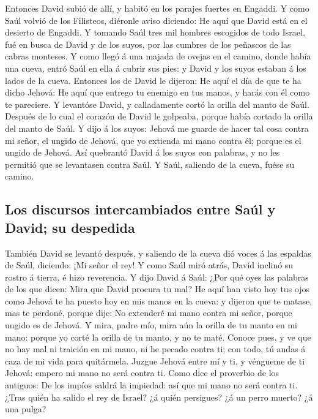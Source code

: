  Entonces David subió de allí, y habitó en los parajes
fuertes en Engaddi.  Y como Saúl volvió de los Filisteos,
diéronle aviso diciendo: He aquí que David está en el desierto de
Engaddi.  Y tomando Saúl tres mil hombres escogidos de
todo Israel, fué en busca de David y de los suyos, por las cumbres de
los peñascos de las cabras monteses.  Y como llegó á una
majada de ovejas en el camino, donde había una cueva, entró Saúl en ella
á cubrir sus pies: y David y los suyos estaban á los lados de la cueva.
 Entonces los de David le dijeron: He aquí el día de que
te ha dicho Jehová: He aquí que entrego tu enemigo en tus manos, y harás
con él como te pareciere. Y levantóse David, y calladamente cortó la
orilla del manto de Saúl.  Después de lo cual el corazón
de David le golpeaba, porque había cortado la orilla del manto de Saúl.
 Y dijo á los suyos: Jehová me guarde de hacer tal cosa
contra mi señor, el ungido de Jehová, que yo extienda mi mano contra él;
porque es el ungido de Jehová.  Así quebrantó David á los
suyos con palabras, y no les permitió que se levantasen contra Saúl. Y
Saúl, saliendo de la cueva, fuése su camino.

\hypertarget{los-discursos-intercambiados-entre-sauxfal-y-david-su-despedida}{%
\subsection{Los discursos intercambiados entre Saúl y David; su
despedida}\label{los-discursos-intercambiados-entre-sauxfal-y-david-su-despedida}}

 También David se levantó después, y saliendo de la cueva
dió voces á las espaldas de Saúl, diciendo: ¡Mi señor el rey! Y como
Saúl miró atrás, David inclinó su rostro á tierra, é hizo reverencia.
 Y dijo David á Saúl: ¿Por qué oyes las palabras de los
que dicen: Mira que David procura tu mal?  He aquí han
visto hoy tus ojos como Jehová te ha puesto hoy en mis manos en la
cueva: y dijeron que te matase, mas te perdoné, porque dije: No
extenderé mi mano contra mi señor, porque ungido es de Jehová.
 Y mira, padre mío, mira aún la orilla de tu manto en mi
mano: porque yo corté la orilla de tu manto, y no te maté. Conoce pues,
y ve que no hay mal ni traición en mi mano, ni he pecado contra ti; con
todo, tú andas á caza de mi vida para quitármela.  Juzgue
Jehová entre mí y ti, y véngueme de ti Jehová: empero mi mano no será
contra ti.  Como dice el proverbio de los antiguos: De
los impíos saldrá la impiedad: así que mi mano no será contra ti.
 ¿Tras quién ha salido el rey de Israel? ¿á quién
persigues? ¿á un perro muerto? ¿á una pulga?

